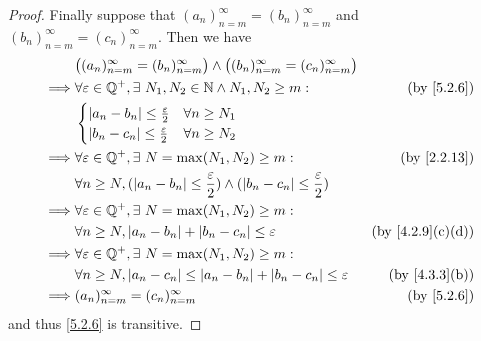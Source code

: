 \begin{proof}
  Finally suppose that \((a_n)_{n = m}^\infty = (b_n)_{n = m}^\infty\) and \((b_n)_{n = m}^\infty = (c_n)_{n = m}^\infty\).
  Then we have
  \begin{align*}
             & \big((a_n)_{n = m}^\infty = (b_n)_{n = m}^\infty\big) \land \big((b_n)_{n = m}^\infty = (c_n)_{n = m}^\infty\big)                                  \\
    \implies & \forall \varepsilon \in \Q^+, \exists\ N_1, N_2 \in \N \land N_1, N_2 \geq m:                                     & \text{(by \cref{5.2.6})}       \\
             & \begin{cases}
                 \abs{a_n - b_n} \leq \frac{\varepsilon}{2} & \forall n \geq N_1 \\
                 \abs{b_n - c_n} \leq \frac{\varepsilon}{2} & \forall n \geq N_2 \\
               \end{cases}                                                                                    \\
    \implies & \forall \varepsilon \in \Q^+, \exists\ N = \max(N_1, N_2) \geq m:                                                 & \text{(by \cref{2.2.13})}      \\
             & \forall n \geq N, (\abs{a_n - b_n} \leq \frac{\varepsilon}{2}) \land (\abs{b_n - c_n} \leq \frac{\varepsilon}{2})                                  \\
    \implies & \forall \varepsilon \in \Q^+, \exists\ N = \max(N_1, N_2) \geq m:                                                                                  \\
             & \forall n \geq N, \abs{a_n - b_n} + \abs{b_n - c_n} \leq \varepsilon                                              & \text{(by \cref{4.2.9}(c)(d))} \\
    \implies & \forall \varepsilon \in \Q^+, \exists\ N = \max(N_1, N_2) \geq m:                                                                                  \\
             & \forall n \geq N, \abs{a_n - c_n} \leq \abs{a_n - b_n} + \abs{b_n - c_n} \leq \varepsilon                         & \text{(by \cref{4.3.3}(b))}    \\
    \implies & (a_n)_{n = m}^\infty = (c_n)_{n = m}^\infty                                                                       & \text{(by \cref{5.2.6})}
  \end{align*}
  and thus \cref{5.2.6} is transitive.
\end{proof}

